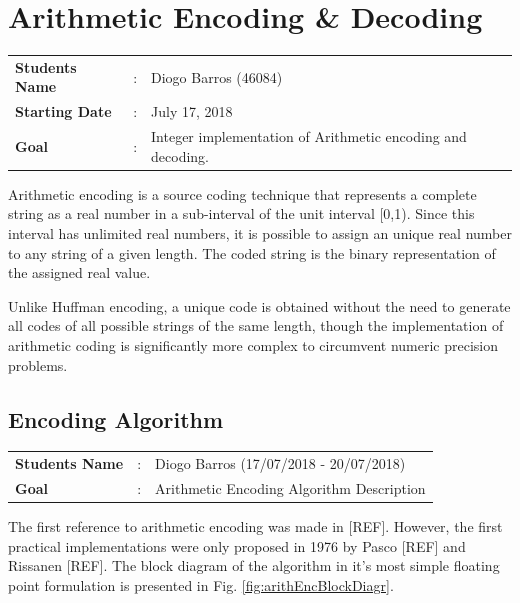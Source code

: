 \clearpage
\section{Arithmetic Encoding \& Decoding}

\begin{refsection}

\begin{tcolorbox}	
\begin{tabular}{p{2.75cm} p{0.2cm} p{10.5cm}} 	
\textbf{Students Name}  &:& Diogo Barros (46084) \\
\textbf{Starting Date} &:& July 17, 2018\\
\textbf{Goal}          &:& Integer implementation of Arithmetic encoding and decoding.
\end{tabular}
\end{tcolorbox}

Arithmetic encoding is a source coding technique that represents a complete string as a real number in a sub-interval of the unit interval [0,1). Since this interval has unlimited real numbers, it is possible to assign an unique real number to any string of a given length. The coded string is the binary representation of the assigned real value.

Unlike Huffman encoding, a unique code is obtained without the need to generate all codes of all possible strings of the same length, though the implementation of arithmetic coding is significantly more complex to circumvent numeric precision problems.

\subsection{Encoding Algorithm}

\begin{tcolorbox}	
	\begin{tabular}{p{2.75cm} p{0.2cm} p{10.5cm}} 	
		\textbf{Students Name}  &:& Diogo Barros (17/07/2018 - 20/07/2018)\\
		\textbf{Goal}          &:& Arithmetic Encoding Algorithm Description
	\end{tabular}
\end{tcolorbox}

The first reference to arithmetic encoding was made in [REF]. However, the first practical implementations were only proposed in 1976 by Pasco [REF] and Rissanen [REF]. The block diagram of the algorithm in it's most simple floating point formulation is presented in Fig. \ref{fig:arithEncBlockDiagr}. 


\end{refsection}
